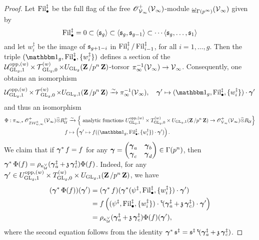 \begin{proof}
Let $\Fil_{\bullet}^{\ddagger}$ be the full flag of the free $\scrO^+_{\calV_{\infty}}(\calV_{\infty})$-module $\underline{\omega}_{\Gamma(p^{\infty})}(\calV_{\infty})$ given by \[
    \Fil_{\bullet}^{\ddagger} = 0 \subset \langle \fraks_g \rangle \subset \langle \fraks_g, \fraks_{g-1} \rangle\subset \cdots \langle \fraks_g, \ldots, \fraks_1\rangle
\] and let $w_i^{\ddagger}$ be the image of $\fraks_{g+1-i}$ in $\Fil_{i}^{\ddagger}/\Fil_{i-1}^{\ddagger}$, for all $i=1, \ldots, g$. Then the triple $(\one_g, \Fil_{\bullet}^{\ddagger}, \{w_i^{\ddagger}\})$ defines a section of the $\calU_{\GL_g, 1}^{\opp, (w)}\times \calT_{\GL_g, 0}^{(w)}\times U_{\GL_g}(\Z/p^n\Z)$-torsor $\pi_{\infty}^{-1}(\calV_{\infty}) \rightarrow \calV_{\infty}$. Consequently, one obtains an isomorphism \[
    \calU_{\GL_g, 1}^{\opp, (w)}\times \calT_{\GL_g, 0}^{(w)} \times U_{\GL_g,1}(\Z/p^n\Z) \xrightarrow{\sim} \pi_{\infty}^{-1}(\calV_{\infty}), \quad \bfgamma' \mapsto (\one_g, \Fil_{\bullet}^{\ddagger}, \{w_i^{\ddagger}\}) \cdot \bfgamma'
\] and thus an isomorphism \begin{align*}
    \Phi: \pi_{\infty, *}\scrO^+_{\adicIW_{w, \infty}^+}(\calV_{\infty})\widehat{\otimes} R^+_{\calU} & \xrightarrow{\sim} \left\{
        \text{ analytic functions }
        U_{\GL_g, 1}^{\opp, (w)}\times T_{\GL_g, 0}^{(w)}\times U_{\GL_g,1}(\Z/p^n\Z) \rightarrow \scrO^+_{\calV_{\infty}}(\calV_{\infty})\widehat{\otimes}R_{\calU} 
\right\}\\
    f & \mapsto \left(\bfgamma'\mapsto f((\one_g, \Fil_{\bullet}^{\ddagger}, \{w_i^{\ddagger}\}) \cdot \bfgamma')\right).
\end{align*} We claim that if $\bfgamma^* f = f$ for any $\bfgamma = \begin{pmatrix}\bfgamma_a & \bfgamma_b \\ \bfgamma_c & \bfgamma_d\end{pmatrix}\in \Gamma(p^n)$, then $\bfgamma^*\Phi(f) = \rho_{\kappa_{\calU}^{\vee}}(\bfgamma_a^{\ddagger} + \frakz\bfgamma_c^{\ddagger})\Phi(f)$. Indeed, for any $\bfgamma' \in U_{\GL_g, 1}^{\opp, (w)}\times T_{\GL_g, 0}^{(w)}\times U_{\GL_g,1}(\Z/p^n\Z)$, we have \begin{align*}
    (\bfgamma^*\Phi(f)) (\bfgamma') & = (\bfgamma^* f)(\bfgamma^*(\psi^{\ddagger}, \Fil_{\bullet}^{\ddagger}, \{w_i^{\ddagger}\}) \cdot \bfgamma')\\ 
    & = f\left((\psi^{\ddagger}, \Fil_{\bullet}^{\ddagger}, \{w_i^{\ddagger}\})\cdot  \trans(\bfgamma_a^{\ddagger} + \frakz\bfgamma_c^{\ddagger})\cdot\bfgamma'\right)\\
    & = \rho_{\kappa_{\calU}^{\vee}}(\bfgamma_a^{\ddagger} + \frakz\bfgamma_c^{\ddagger}) \Phi(f)(\bfgamma'),
\end{align*} where the second equation follows from the identity $\bfgamma^* \fraks^{\ddagger} = \fraks^{\ddagger} \trans(\bfgamma_a^{\ddagger} + \frakz\bfgamma_c^{\ddagger})$.


\end{proof}
